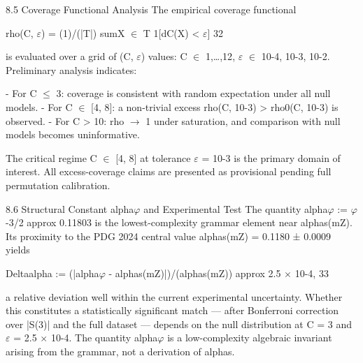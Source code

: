   8.5 Coverage Functional Analysis
  The empirical coverage functional

  rho(C, $\varepsilon$) = (1)/(|T|) sumX $\in$ T 1[dC(X) < $\varepsilon$] 32

  is evaluated over a grid of (C, $\varepsilon$) values: C $\in$ {1,…,12}, $\varepsilon$ $\in$ {10-4, 10-3, 10-2}.
  Preliminary analysis indicates:

  - For C $\leq$ 3: coverage is consistent with random expectation under all null models.
  - For C $\in$ [4, 8]: a non-trivial excess rho(C, 10-3) > rho0(C, 10-3) is observed.
  - For C > 10: rho $\rightarrow$ 1 under saturation, and comparison with null models becomes
  uninformative.

  The critical regime C $\in$ [4, 8] at tolerance $\varepsilon$ = 10-3 is the primary domain of interest. All
  excess-coverage claims are presented as provisional pending full permutation
  calibration.

  8.6 Structural Constant alpha$\varphi$ and Experimental Test
  The quantity alpha$\varphi$ := $\varphi$-3/2 approx 0.11803 is the lowest-complexity grammar
  element near alphas(mZ). Its proximity to the PDG 2024 central value \citep{pdg2024} alphas(mZ) =
  0.1180 ± 0.0009 yields

  Deltaalpha := (|alpha$\varphi$ - alphas(mZ)|)/(alphas(mZ)) approx 2.5 $\times$ 10-4, 33

  a relative deviation well within the current experimental uncertainty. Whether this
  constitutes a statistically significant match --- after Bonferroni correction over |S(3)|
  and the full dataset --- depends on the null distribution at C = 3 and $\varepsilon$ = 2.5 $\times$ 10-4. The
  quantity alpha$\varphi$ is a low-complexity algebraic invariant arising from the grammar, not a
  derivation of alphas.

